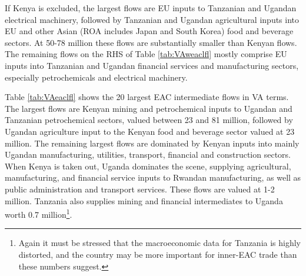 \documentclass[a4paper]{article}
\begin{document}
If Kenya is excluded, the largest flows are EU inputs to Tanzanian and Ugandan electrical machinery, followed by Tanzanian and Ugandan agricultural inputs into EU and other Asian (ROA includes Japan and South Korea) food and beverage sectors. At 50-78 million these flows are substantially smaller than Kenyan flows. The remaining flows on the RHS of Table \ref{tab:VAweaclfl} mostly comprise EU inputs into Tanzanian and Ugandan financial services and manufacturing sectors, especially petrochemicals and electrical machinery. \newline

Table \ref{tab:VAeaclfl} shows the 20 largest EAC intermediate flows in VA terms. The largest flows are Kenyan mining and petrochemical inputs to Ugandan and Tanzanian petrochemical sectors, valued between 23 and 81 million, followed by Ugandan agriculture input to the Kenyan food and beverage sector valued at 23 million. The remaining largest flows are dominated by Kenyan inputs into mainly Ugandan manufacturing, utilities, transport, financial and construction sectors. When Kenya is taken out, Uganda dominates the scene, supplying agricultural, manufacturing, and financial service inputs to Rwandan manufacturing, as well as public administration and transport services. These flows are valued at 1-2 million. Tanzania also supplies mining and financial intermediates to Uganda worth 0.7 million\footnote{Again it must be stressed that the macroeconomic data for Tanzania is highly distorted, and the country may be more important for inner-EAC trade than these numbers suggest.}.
\end{document}

